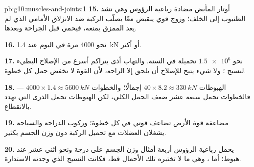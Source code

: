 \begin{solution}{pb:g10:muscles-and-joints:1}
\textbf{15.} أوتار المأبض مضادة رباعية الرؤوس وهي تشد الظنبوب إلى
الخلف؛ وزوج قوي ينقبض معًا يصلّب الركبة ضد الانزلاق الأمامي الذي لم
يعد  الممزق يمنعه، فيحمي  قبل الجراحة وبعدها.

\textbf{16.} نحو 4000 مرة في اليوم عند \qty{1.4}{kN} أو أكثر.

\textbf{17.} نحو $\num{1.5e6}$ تحميلة في السنة. والتهاب  أذى
يتراكم أسرع من الإصلاح البطيء لنسيج ؛ ولا شيء يتيح للإصلاح أن
يلحق إلا الراحة، لأن القوة لا تخفض حمل كل خطوة.

\textbf{18.} الهبوطات $40 \times 8.2 \approx \qty{330}{kN}$ إجمالًا؛
والخطوات $4000 \times 1.4 \approx \qty{5600}{kN}$ --- فالخطوات تحمل
سبعة عشر ضعف الحمل الكلي، لكن الهبوطات تحمل الذرى التي تهدد بالانقطاع.

\textbf{19.} مضاعفة قوة الأرض تضاعف قوتي   في كل خطوة؛
وركوب الدراجة والسباحة يشغلان العضلات مع تحميل الركبة دون وزن الجسم
بكثير.

\textbf{20.} يحمل  رباعية الرؤوس أربعة أمثال وزن الجسم على درجة
ونحو اثني عشر عند هبوط؛ أما ، وهي ما لا تختبره تلك الأحمال
قط، فكانت النسيج الذي وجدته الاستدارة.
\end{solution}
